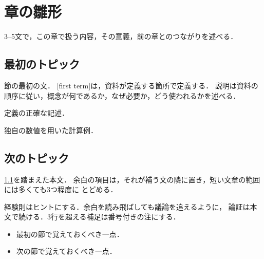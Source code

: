 \documentclass[../main.tex]{subfiles}
\begin{document}
\chapter{章の雛形}

3--5文で，この章で扱う内容，その意義，前の章とのつながりを述べる．

\section{最初のトピック}
\label{sec:l02-first}

節の最初の文．
[first term]は，資料が定義する箇所で定義する．
説明は資料の順序に従い，概念が何であるか，なぜ必要か，どう使われるかを述べる．

\begin{definition}[最初の用語]
  \label{def:l02-first}
  定義の正確な記述．
\end{definition}

\begin{example}
  \label{ex:l02-first}
  独自の数値を用いた計算例．
\end{example}

\section{次のトピック}
\label{sec:l02-second}

\cref{sec:l02-first}を踏まえた本文．
余白の項目は，それが補う文の隣に置き，短い文章の範囲には多くても3つ程度に
とどめる．

経験則はヒントにする．余白を読み飛ばしても議論を追えるように，
論証は本文で続ける．3行を超える補足は番号付きの注にする．

\begin{keypoint}[章のまとめ]
  \begin{itemize}
    \item 最初の節で覚えておくべき一点．
    \item 次の節で覚えておくべき一点．
  \end{itemize}
\end{keypoint}
\end{document}
